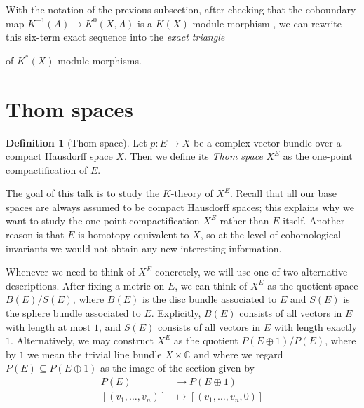 \documentclass[12pt,a4paper]{amsart}
\theoremstyle{plain}
\theoremstyle{definition}
\newtheorem{defn}[thm]{Definition}
\theoremstyle{remark}
\begin{document}
With the notation of the previous subsection, after checking that the coboundary map $K^{-1}(A) \to K^{0}(X,A)$ is a $K(X)$-module morphism \cite[Lemma 2.6.0]{ati67}, we can rewrite this six-term exact sequence into the \textit{exact triangle}

\begin{center}
\end{center}

of $K^{*}(X)$-module morphisms.

\section{Thom spaces}

\begin{defn}[Thom space]
  Let $p \colon E \to X$ be a complex vector bundle over a compact Hausdorff space $X$.
  Then we define its \textit{Thom space} $X^{E}$ as the one-point compactification of $E$.
\end{defn}

The goal of this talk is to study the $K$-theory of $X^{E}$.
Recall that all our base spaces are always assumed to be compact Hausdorff spaces; this explains why we want to study the one-point compactification $X^{E}$ rather than $E$ itself.
Another reason is that $E$ is homotopy equivalent to $X$, so at the level of cohomological invariants we would not obtain any new interesting information.

Whenever we need to think of $X^{E}$ concretely, we will use one of two alternative descriptions.
After fixing a metric on $E$, we can think of $X^{E}$ as the quotient space $B(E)/S(E)$, where $B(E)$ is the disc bundle associated to $E$ and $S(E)$ is the sphere bundle associated to $E$.
Explicitly, $B(E)$ consists of all vectors in $E$ with length at most $1$, and $S(E)$ consists of all vectors in $E$ with length exactly $1$.
Alternatively, we may construct $X^{E}$ as the quotient $P(E \oplus 1) / P(E)$, where by $1$ we mean the trivial line bundle $X \times \mathbb{C}$ and where we regard $P(E) \subseteq P(E \oplus 1)$ as the image of the section given by
\begin{align*}
  P(E) & \to P(E \oplus 1) \\
  [(v_{1}, \ldots, v_{n})] & \mapsto [(v_{1}, \ldots, v_{n}, 0)]
\end{align*}
\end{document}
